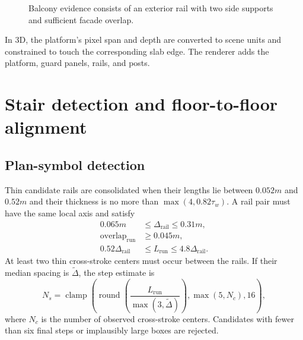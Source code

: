\documentclass[11pt,a4paper]{article}
\newcommand{\clamp}{\operatorname{clamp}}
\begin{document}
\begin{figure}[htbp]
\centering
{}
\caption{Balcony evidence consists of an exterior rail with two side supports and sufficient facade overlap.}
\label{fig:balcony}
\end{figure}

In 3D, the platform's pixel span and depth are converted to scene units and constrained to touch the corresponding slab edge. The renderer adds the platform, guard panels, rails, and posts.

\section{Stair detection and floor-to-floor alignment}

\subsection{Plan-symbol detection}

Thin candidate rails are consolidated when their lengths lie between $0.052m$ and $0.52m$ and their thickness is no more than $\max(4,0.82\tau_w)$. A rail pair must have the same local axis and satisfy
\begin{align}
0.065m &\leq \Delta_{\text{rail}}\leq0.31m,\\
\text{overlap}_{\text{run}}&\geq0.045m,\\
0.52\Delta_{\text{rail}}&\leq L_{\text{run}}\leq4.8\Delta_{\text{rail}}.
\end{align}
At least two thin cross-stroke centers must occur between the rails. If their median spacing is $\widetilde{\Delta}$, the step estimate is
\begin{equation}
N_s=\clamp\left(\operatorname{round}\left(\frac{L_{\text{run}}}{\max(3,\widetilde{\Delta})}\right),\max(5,N_c),16\right),
\end{equation}
where $N_c$ is the number of observed cross-stroke centers. Candidates with fewer than six final steps or implausibly large boxes are rejected.
\end{document}
